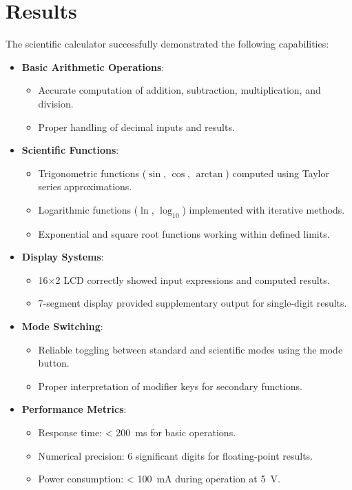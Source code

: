 \documentclass[journal]{IEEEtran}
\begin{document}
\section{Results}
The scientific calculator successfully demonstrated the following capabilities:

\begin{itemize}
    \item \textbf{Basic Arithmetic Operations}:
    \begin{itemize}
        \item Accurate computation of addition, subtraction, multiplication, and division.
        \item Proper handling of decimal inputs and results.
    \end{itemize}
    
    \item \textbf{Scientific Functions}:
    \begin{itemize}
        \item Trigonometric functions ($\sin$, $\cos$, $\arctan$) computed using Taylor series approximations.
        \item Logarithmic functions ($\ln$, $\log_{10}$) implemented with iterative methods.
        \item Exponential and square root functions working within defined limits.
    \end{itemize}
    
    \item \textbf{Display Systems}:
    \begin{itemize}
        \item 16$\times$2 LCD correctly showed input expressions and computed results.
        \item 7-segment display provided supplementary output for single-digit results.
    \end{itemize}
    
    \item \textbf{Mode Switching}:
    \begin{itemize}
        \item Reliable toggling between standard and scientific modes using the mode button.
        \item Proper interpretation of modifier keys for secondary functions.
    \end{itemize}
    
    \item \textbf{Performance Metrics}:
    \begin{itemize}
        \item Response time: < \SI{200}{\milli\second} for basic operations.
        \item Numerical precision: 6 significant digits for floating-point results.
        \item Power consumption: < \SI{100}{\milli\ampere} during operation at \SI{5}{\volt}.
    \end{itemize}
    

\end{itemize}
\end{document}
